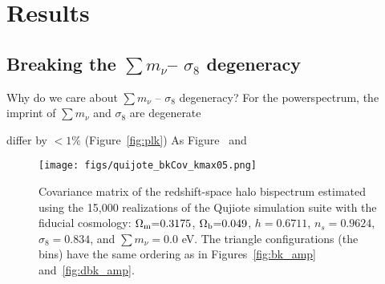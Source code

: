 \documentclass[12pt, letterpaper, preprint]{aastex62}
\newcommand{\Om}{\Omega_{\rm m}}
\newcommand{\Ob}{\Omega_{\rm b}}
\newcommand{\smnu}{\sum m_\nu}
\newcommand{\sig}{\sigma_8}
\newcommand{\ch}[1]{{\color{orange}{\bf CH:} #1}}
\begin{document}
\section{Results} \label{sec:results} 
\subsection{Breaking the $\smnu$-- $\sig$ degeneracy} \label{sec:mnusig}
\ch{Why do we care about $\smnu$ -- $\sig$ degeneracy?} 
For the powerspectrum, the imprint of $\smnu$ and $\sig$ are degenerate 

differ by $< 1\%$ (Figure~\ref{fig:plk})
As Figure~ and~\cite{villaescusa-navarro2018} 




\begin{figure}
\begin{center}
    \texttt{[image: figs/quijote\_bkCov\_kmax05.png]} 
    \caption{Covariance matrix of the redshift-space halo bispectrum estimated 
    using the 15,000 realizations of the Qujiote simulation suite with the 
    fiducial cosmology: $\Om{=}0.3175$, $\Ob{=}0.049$, $h{=}0.6711$, $n_s{=}0.9624$, $\sig{=}0.834$, 
    and $\smnu{=}0.0$ eV. The triangle configurations (the bins) have the same 
    ordering as in Figures~\ref{fig:bk_amp} and~\ref{fig:dbk_amp}.
    }
\label{fig:bk_cov}
\end{center}
\end{figure}
\end{document}
